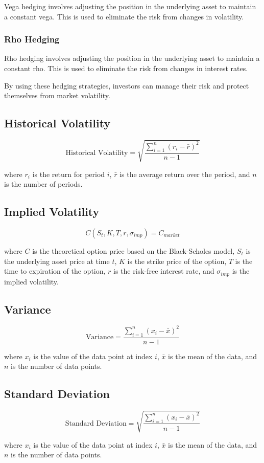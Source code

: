 \documentclass{article}
\theoremstyle{mytheoremstyle}
\theoremstyle{mytheoremstyle}
\theoremstyle{myproblemstyle}
\begin{document}
Vega hedging involves adjusting the position in the underlying asset to maintain a constant vega. This is used to eliminate the risk from changes in volatility.

\subsubsection{Rho Hedging}

Rho hedging involves adjusting the position in the underlying asset to maintain a constant rho. This is used to eliminate the risk from changes in interest rates.

By using these hedging strategies, investors can manage their risk and protect themselves from market volatility.



\subsection{Historical Volatility}
\begin{equation}
\text{Historical Volatility} = \sqrt{\frac{\sum_{i=1}^{n}(r_i - \bar{r})^2}{n-1}}
\end{equation}

where $r_i$ is the return for period $i$, $\bar{r}$ is the average return over the period, and $n$ is the number of periods.

\subsection{Implied Volatility}
\begin{equation}
C(S_t,K,T,r,\sigma_{imp}) = C_{market}
\end{equation}

where $C$ is the theoretical option price based on the Black-Scholes model, $S_t$ is the underlying asset price at time $t$, $K$ is the strike price of the option, $T$ is the time to expiration of the option, $r$ is the risk-free interest rate, and $\sigma_{imp}$ is the implied volatility.

\subsection{Variance}
\begin{equation}
\text{Variance} = \frac{\sum_{i=1}^{n}(x_i - \bar{x})^2}{n-1}
\end{equation}

where $x_i$ is the value of the data point at index $i$, $\bar{x}$ is the mean of the data, and $n$ is the number of data points.

\subsection{Standard Deviation}
\begin{equation}
\text{Standard Deviation} = \sqrt{\frac{\sum_{i=1}^{n}(x_i - \bar{x})^2}{n-1}}
\end{equation}

where $x_i$ is the value of the data point at index $i$, $\bar{x}$ is the mean of the data, and $n$ is the number of data points.
\end{document}
